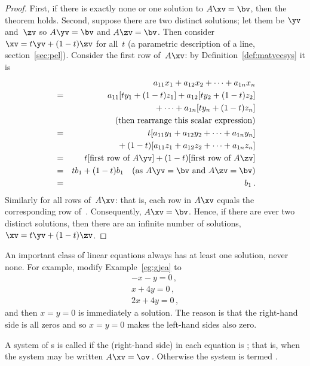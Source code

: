 \begin{proof} 
First, if there is exactly none or one solution to \(A\xv=\bv\), then the theorem holds. 
Second, suppose there are two distinct solutions; let them be \(\yv\) and~\(\zv\) so \(A\yv=\bv\) and \(A\zv=\bv\).  
Then consider \(\xv=t\yv+(1-t)\zv\) for all~\(t\) (a parametric description of a line, section~\ref{sec:pel}). 
Consider the first row of~\(A\xv\): by Definition~\ref{def:matvecsys} it is
\begin{eqnarray*}&&
a_{11}x_1+a_{12}x_2+\cdots+a_{1n}x_n
\\&=&a_{11}[ty_1+(1-t)z_1]+a_{12}[ty_2+(1-t)z_2]
\\&&{}
+\cdots+a_{1n}[ty_n+(1-t)z_n]
\\&&\quad(\text{then rearrange this scalar expression})
\\&=&t[a_{11}y_1+a_{12}y_2+\cdots+a_{1n}y_n]
\\&&{}
+(1-t)[a_{11}z_1+a_{12}z_2+\cdots+a_{1n}z_n]
\\&=&t[\text{first row of }A\yv]
+(1-t)[\text{first row of }A\zv]
\\&=&tb_1+(1-t)b_1 \quad(\text{as }A\yv=\bv\text{ and }A\zv=\bv)
\\&=&b_1\,.
\end{eqnarray*}
Similarly for all rows of~\(A\xv\): that is, each row in \(A\xv\) equals the corresponding row of~\bv.
Consequently, \(A\xv=\bv\). 
Hence, if there are ever two distinct solutions, then there are an infinite number of solutions, \(\xv=t\yv+(1-t)\zv\).
\end{proof}




An important class of linear equations always has at least one solution, never none.
For example, modify Example~\ref{eg:gjea} to 
\begin{equation*}
\begin{array}{l}
-x-y=0\,,\\x+4y=0\,,\\2x+4y=0\,,
\end{array}
\end{equation*}
and then \(x=y=0\) is immediately a solution.  
The reason is that the right-hand side is all zeros and so \(x=y=0\) makes the left-hand sides also zero.

\begin{definition} \label{def:homosys} 
A system of s is called  if the (right-hand side)  in each equation is ; that is, when the system may be written \(A\xv=\ov\)\,.
Otherwise the system is termed .
\end{definition}

